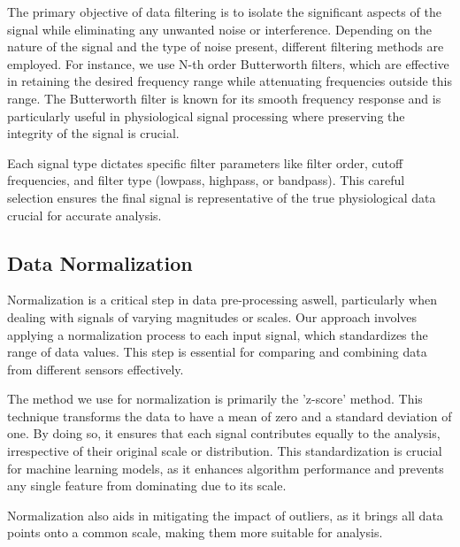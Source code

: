 The primary objective of data filtering is to isolate the significant aspects of the signal while eliminating any unwanted noise or interference. Depending on the nature of the signal and the type of noise present, different filtering methods are employed. For instance, we use N-th order Butterworth filters, which are effective in retaining the desired frequency range while attenuating frequencies outside this range. The Butterworth filter is known for its smooth frequency response and is particularly useful in physiological signal processing where preserving the integrity of the signal is crucial.

Each signal type dictates specific filter parameters like filter order, cutoff frequencies, and filter type (lowpass, highpass, or bandpass). This careful selection ensures the final signal is representative of the true physiological data crucial for accurate analysis.

\subsection*{Data Normalization }
Normalization is a critical step in data pre-processing aswell, particularly when dealing with signals of varying magnitudes or scales. Our approach involves applying a normalization process to each input signal, which standardizes the range of data values. This step is essential for comparing and combining data from different sensors effectively.

The method we use for normalization is primarily the 'z-score' method. This technique transforms the data to have a mean of zero and a standard deviation of one. By doing so, it ensures that each signal contributes equally to the analysis, irrespective of their original scale or distribution. This standardization is crucial for machine learning models, as it enhances algorithm performance and prevents any single feature from dominating due to its scale.

Normalization also aids in mitigating the impact of outliers, as it brings all data points onto a common scale, making them more suitable for analysis.

